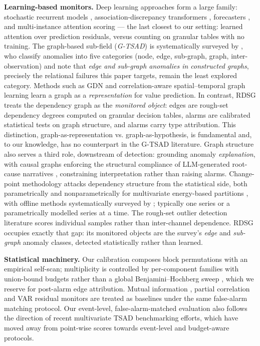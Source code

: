 \documentclass[11pt,a4paper]{article}
\newcommand{\RDSG}{RDSG}
\begin{document}
\textbf{Learning-based monitors.} Deep learning approaches form a large
family: stochastic recurrent models \citep{su2019omni}, association-discrepancy
transformers \citep{xu2022anomaly}, forecasters \citep{tuli2022tranad}, and
multi-instance attention scoring \citep{jang2024cs} --- the last closest
to our setting: learned attention over prediction residuals, versus
counting on granular tables with no training. The graph-based sub-field (\emph{G-TSAD}) is
systematically surveyed by \citet{ho2025gtsad}, who classify anomalies
into five categories (node, edge, sub-graph, graph, inter-observation)
and note that \emph{edge and sub-graph anomalies in
constructed graphs}, precisely the relational failures this paper
targets, remain the least explored category. Methods such as GDN
\citep{deng2021gdn} and correlation-aware spatial--temporal graph learning
\citep{zheng2024cstgl} learn a graph as a \emph{representation} for value
prediction. In contrast,
\RDSG{} treats the dependency graph as the \emph{monitored object}: edges
are rough-set dependency degrees computed on granular decision tables,
alarms are calibrated statistical tests on graph structure, and alarms carry
type attribution. This distinction, graph-as-representation vs.
graph-as-hypothesis, is fundamental and, to our knowledge, has no counterpart in the
G-TSAD literature. Graph structure also serves a third role, downstream of
detection: grounding anomaly \emph{explanation}, with causal graphs
enforcing the structural compliance of LLM-generated root-cause narratives
\citep{zhang2026exsy70467}, constraining interpretation rather than
raising alarms. Change-point methodology attacks dependency structure
from the statistical side, both parametrically
\citep{xuan2007changing,killick2012pelt} and nonparametrically for
multivariate energy-based partitions \citep{matteson2014ecp}, with offline
methods systematically surveyed by \citet{truong2020cpss};
typically one series or a parametrically modelled series at a time.
The rough-set outlier detection literature
\citep{tsmc2022entropy,tkde2026granularball,ijar2025multiview,asoc2024consistency}
scores individual samples rather than inter-channel dependence. \RDSG{} occupies exactly that gap: its monitored objects
are the survey's \emph{edge} and \emph{sub-graph} anomaly classes, detected
statistically rather than learned.

\textbf{Statistical machinery.} Our calibration composes block permutations
\citep{kunsch1989} with an empirical self-scan; multiplicity is controlled by
per-component families with union-bound budgets rather than a global
Benjamini--Hochberg sweep \citep{benjamini1995}, which we reserve for
post-alarm edge attribution. Mutual information
\citep{kraskov2004}, partial correlation and VAR residual monitors
\citep{granger1969} are treated as baselines under the same false-alarm
matching protocol. Our event-level, false-alarm-matched evaluation also
follows the direction of recent multivariate TSAD benchmarking efforts,
which have moved away from point-wise scores towards event-level and
budget-aware protocols.
\end{document}
